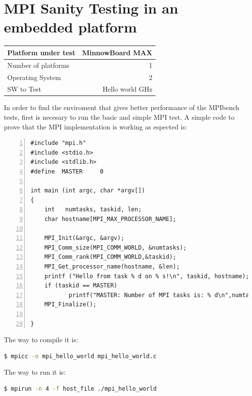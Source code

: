\section{MPI Sanity Testing in an embedded platform}


    \begin{center}
    \begin{tabular}{ | l | r |}
        \hline
        Platform under test &  MinnowBoard MAX \\ \hline
        Number of platforms  & 1  \\ \hline
        Operating System & 2  \\ \hline
        SW to Test & Hello world GHz  \\ \hline
    \end{tabular}
    \end{center}


In order to find the enviroment that gives better performance of the MPIbench
tests, first is necesary to run the basic and simple MPI test. A simple code to
prove that the MPI implementation is working as espected is:

\begin{lstlisting}[frame=single,numbers=left,breaklines=true,basicstyle=\tiny]
#include "mpi.h"
#include <stdio.h>
#include <stdlib.h>
#define  MASTER     0

int main (int argc, char *argv[])
{
    int   numtasks, taskid, len;
    char hostname[MPI_MAX_PROCESSOR_NAME];

    MPI_Init(&argc, &argv);
    MPI_Comm_size(MPI_COMM_WORLD, &numtasks);
    MPI_Comm_rank(MPI_COMM_WORLD,&taskid);
    MPI_Get_processor_name(hostname, &len);
    printf ("Hello from task % d on % s!\n", taskid, hostname);
    if (taskid == MASTER)
           printf("MASTER: Number of MPI tasks is: % d\n",numtasks);
    MPI_Finalize();

}
\end{lstlisting}

The way to compile it is: 

\begin{lstlisting}[frame=single,language=bash]
  $ mpicc -o mpi_hello_world mpi_hello_world.c
\end{lstlisting}


The way to run it is: 

\begin{lstlisting}[frame=single,language=bash]
  $ mpirun -n 4 -f host_file ./mpi_hello_world
\end{lstlisting}

